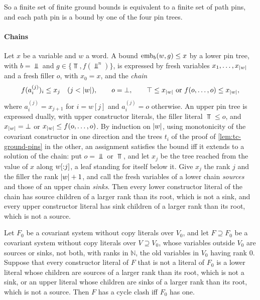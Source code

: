 So a finite set of finite ground bounds is equivalent to a finite set of path
pins, and each path pin is a bound by one of the four pin trees.

\paragraph{Chains}
Let $x$ be a variable and $w$ a word. A bound $\operatorname{emb}_b(w,g)\le x$ by a lower pin
tree, with $b=\Bot$ and $g\in\{\Top,f(\Bot^n)\}$, is expressed by fresh
variables $x_1,\ldots,x_{\lvert w\rvert}$ and a fresh filler $o$, with $x_0=x$, and the
\emph{chain}
\[
 f(a^{(j)}_i)_i\le x_j\quad(j<\lvert w\rvert),\qquad
 o=\bot,\qquad
 \top\le x_{\lvert w\rvert}\ \text{or}\ f(o,\ldots,o)\le x_{\lvert w\rvert},
\]
where $a^{(j)}_i=x_{j+1}$ for $i=w[j]$ and $a^{(j)}_i=o$ otherwise. An upper
pin tree is expressed dually, with upper constructor literals, the filler
literal $\Top\le o$, and $x_{\lvert w\rvert}=\bot$ or $x_{\lvert w\rvert}\le f(o,\ldots,o)$. By
induction on $\lvert w\rvert$, using monotonicity of the covariant constructor in one
direction and the trees $t_i$ of the proof of \cref{lem:tc-ground-pins} in the
other, an assignment satisfies the bound iff it extends to a solution of the
chain: put $o=\Bot$ or $\Top$, and let $x_j$ be the tree reached from the value
of $x$ along $w[{:}j]$, a leaf standing for itself below it. Give $x_j$ the
rank $j$ and the filler the rank $\lvert w\rvert+1$, and call the fresh variables of a
lower chain \emph{sources} and those of an upper chain \emph{sinks}. Then every
lower constructor literal of the chain has source children of a larger rank
than its root, which is not a sink, and every upper constructor literal has sink
children of a larger rank than its root, which is not a source.

\begin{lemma}\label{lem:tc-ranked}
Let $F_0$ be a covariant system without copy literals over $V_0$, and let
$F\supseteq F_0$ be a covariant system without copy literals over
$V\supseteq V_0$, whose variables outside $V_0$ are sources or sinks, not
both, with ranks in $\mathbb N$, the old variables in $V_0$ having rank $0$.
Suppose that every constructor literal of $F$ that is not a literal of $F_0$ is
a lower literal whose children are sources of a larger rank than its root,
which is not a sink, or an upper literal whose children are sinks of a larger
rank than its root, which is not a source. Then $F$ has a cycle clash iff
$F_0$ has one.
\end{lemma}

